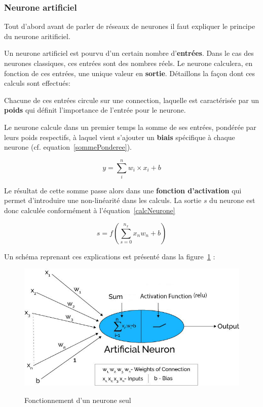 \hypertarget{Neurone-artificiel}{%
\subsubsection{Neurone artificiel}
\label{Neurone-artificiel}}
Tout d'abord avant de parler de réseaux de neurones il faut expliquer le principe du neurone aritificiel.

Un neurone artificiel est pourvu d'un certain nombre d'\textbf{entrées}. Dans le cas des neurones classiques, ces entrées sont des nombres réels. Le neurone calculera, en fonction de ces entrées, une unique valeur en \textbf{sortie}.
Détaillons la façon dont ces calculs sont effectués:

Chacune de ces entrées circule sur une connection, laquelle est caractérisée par un \textbf{poids} qui définit l'importance de l'entrée pour le neurone.

Le neurone calcule dans un premier temps la somme de ses entrées, pondérée par leurs poids respectifs, à laquel vient s'ajouter un \textbf{biais} spécifique à chaque neurone (cf. equation~\ref{sommePonderee}).

\begin{equation}
\label{sommePonderee}
y = \sum_{i}^{n} w_i \times x_i + b
\end{equation}

Le résultat de cette somme passe alors dans une \textbf{fonction d'activation} qui permet d'introduire une non-linéarité dans les calculs. La sortie $s$ du neurone est donc calculée conformément à l'équation~\ref{calcNeurone}

\begin{equation}
\label{calcNeurone}
s = f(\sum_{s=0}^{n_{x}} x_{n}w_{n} + b)
\end{equation}

Un schéma reprenant ces explications est présenté dans la figure~\ref{neuroneSeul} :

\begin{figure}[h]
\includegraphics[width=16.5cm]{./images/image2.jpg}
\label{neuroneSeul}
\caption{Fonctionnement d'un neurone seul}
\end{figure}

